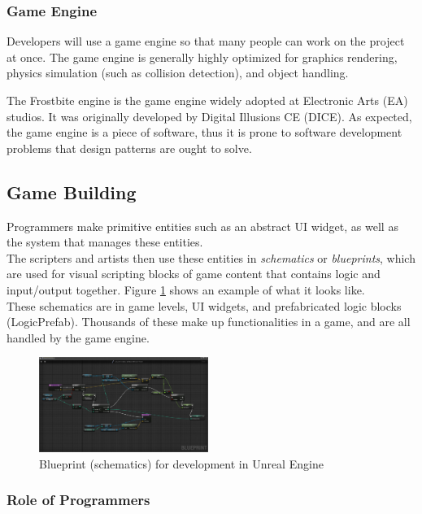 \documentclass[10pt,letterpaper]{article}
\newcommand{\bs}{\bigskip}
\begin{document}
\begin{multicols}{2}
\subsubsection{Game Engine}
Developers will use a game engine so that many people can work on the project at once. The game engine is generally highly optimized for graphics rendering, physics simulation (such as collision detection), and object handling.\bs

The Frostbite engine is the game engine widely adopted at Electronic Arts (EA) studios. It was originally developed by Digital Illusions CE (DICE).\cite{frostbite}\cite{frostbite-wiki} As expected, the game engine is a piece of software, thus it is prone to software development problems that design patterns are ought to solve.

\subsection{Game Building}

Programmers make primitive entities such as an abstract UI widget, as well as the system that manages these entities.\bs
\\
The scripters and artists then use these entities in \textit{schematics} or \textit{blueprints}, which are used for visual scripting blocks of game content that contains logic and input/output together. Figure \ref{fig:unreal-blueprint} shows an example of what it looks like.\bs
\\
These schematics are in game levels, UI widgets, and prefabricated logic blocks (LogicPrefab). Thousands of these make up functionalities in a game, and are all handled by the game engine.

\begin{figure}[H]
	\centering
	\includegraphics[width=0.49\textwidth]{assets/unreal-blueprint}
	\caption{Blueprint (schematics) for development in Unreal Engine\cite{unity-vs-unreal}}
	\label{fig:unreal-blueprint}
\end{figure}

\subsubsection{Role of Programmers}


\end{multicols}
\end{document}

